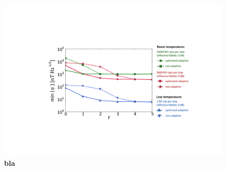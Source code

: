 \documentclass{report}
\begin{document}
\begin{figure}
	\centering
	\includegraphics[width=12cm]{figures/fig_S6}
	\caption{\label{fig:ammS6} \textbf{bla}}
\end{figure}
%
%
\end{document}
